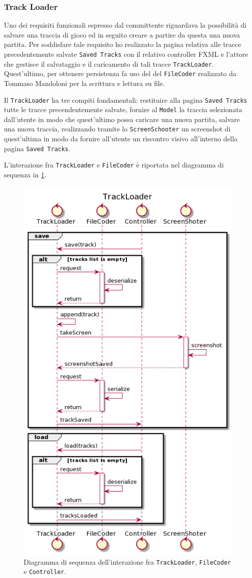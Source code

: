 \subsubsection{Track Loader}\label{subsec:track-loader}
Uno dei requisiti funzionali espresso dal committente riguardava la possibilità di salvare una traccia di gioco ed in seguito
creare a partire da questa una nuova partita. Per soddisfare tale requisito ho realizzato la pagina relativa alle
tracce precedentemente salvate \texttt{Saved Tracks} con il relativo controller FXML e l'attore che gestisce il salvataggio
e il caricamento di tali tracce \texttt{TrackLoader}. Quest'ultimo, per ottenere persistenza fa uso del
del \texttt{FileCoder} realizzato da Tommaso Mandoloni per la scrittura e lettura su file.

Il \texttt{TrackLoader} ha tre compiti fondamentali: restituire alla pagina \texttt{Saved Tracks} tutte le tracce precendentemente salvate,
fornire al \texttt{Model} la traccia selezionata dall'utente in modo che quest'ultimo possa caricare una nuova partita,
salvare una nuova traccia, realizzando tramite lo \texttt{ScreenSchooter} un screenshot di quest'ultima
in modo da fornire all'utente un riscontro visivo all'interno della pagina \texttt{Saved Tracks}.

L'interazione fra \texttt{TrackLoader} e \texttt{FileCoder} è riportata nel diagramma di sequenza in \ref{fig:sequence-track-loader}.


\begin{figure}[H]
    \centering
    \includegraphics[width=.57\linewidth]{img/sequence-track-loader}
    \caption{Diagramma di sequenza dell'interazione fra \texttt{TrackLoader}, \texttt{FileCoder} e \texttt{Controller}.}
    \label{fig:sequence-track-loader}
\end{figure}



